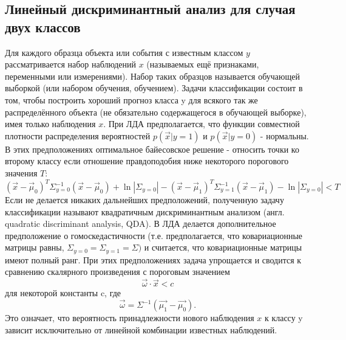 ﻿\documentclass[a4paper,12pt]{article}
\theoremstyle{plain}
\begin{document}
\subsection{Линейный дискриминантный анализ для случая двух классов}
Для каждого образца объекта или события с известным классом $y$ рассматривается набор наблюдений $x$ (называемых ещё признаками, переменными или измерениями). Набор таких образцов называется обучающей выборкой (или набором обучения, обучением). Задачи классификации состоит в том, чтобы построить хороший прогноз класса y для всякого так же распределённого объекта (не обязательно содержащегося в обучающей выборке), имея только наблюдения $x$.\newline
При ЛДА предполагается, что функции совместной плотности распределения вероятностей $p(\vec{x}|y=1)$ и $p(\vec{x}|y=0)$ - нормальны. В этих предположениях оптимальное байесовское решение - относить точки ко второму классу если отношение правдоподобия ниже некоторого порогового значения $T$: $$(\vec{x}-\vec{\mu}_0)^T\Sigma_{y=0}^{-1}(\vec{x}-\vec{\mu}_0)+\ln{|\Sigma _{y=0}|}-(\vec{x}-\vec{\mu}_1)^T\Sigma _{y=1}^{-1}(\vec{x}-\vec{\mu}_1)-\ln{|\Sigma_{y=0}|}<T $$
Если не делается никаких дальнейших предположений, полученную задачу классификации называют квадратичным дискриминантным анализом (англ. quadratic discriminant analysis, QDA). В ЛДА делается дополнительное предположение о гомоскедастичности (т.е. предполагается, что ковариационные матрицы равны, $\Sigma_{y=0}=\Sigma_{y=1}=\Sigma)$ и считается, что ковариационные матрицы имеют полный ранг. При этих предположениях задача упрощается и сводится к сравнению скалярного произведения с пороговым значением 
$$\vec{\omega}\cdot\vec{x}<c $$
для некоторой константы c, где 
$$\vec{\omega}=\Sigma^{-1}(\vec{\mu_1}-\vec{\mu_0}). $$
Это означает, что вероятность принадлежности нового наблюдения $x$ к классу y зависит исключительно от линейной комбинации известных наблюдений.
\end{document}
